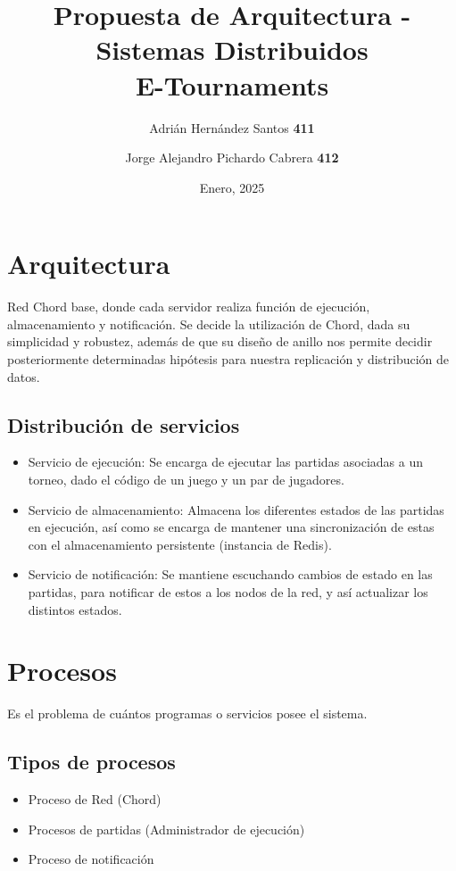 \documentclass{article}
\title{Propuesta de Arquitectura - Sistemas Distribuidos \\ \textbf{E-Tournaments}}
\author{Adrián Hernández Santos \textbf{411} \and Jorge Alejandro Pichardo Cabrera \textbf{412}}
\date{Enero, 2025}
\begin{document}
\maketitle

\section{Arquitectura}
Red Chord base, donde cada servidor realiza función de ejecución, almacenamiento y notificación.
Se decide la utilización de Chord, dada su simplicidad y robustez, además de que su diseño de anillo nos permite decidir posteriormente determinadas hipótesis para nuestra replicación y distribución de datos.

\subsection{Distribución de servicios}
\begin{itemize}
\item{Servicio de ejecución:} Se encarga de ejecutar las partidas asociadas a un torneo, dado el código de un juego y un par de jugadores.
\item{Servicio de almacenamiento:} Almacena los diferentes estados de las partidas en ejecución, así como se encarga de mantener una sincronización de estas con el almacenamiento persistente (instancia de Redis).
\item{Servicio de notificación:} Se mantiene escuchando cambios de estado en las partidas, para notificar de estos a los nodos de la red, y así actualizar los distintos estados.
\end{itemize}

\section{Procesos}
Es el problema de cuántos programas o servicios posee el sistema.

\subsection{Tipos de procesos}
\begin{itemize}
\item{Proceso de Red (Chord)}
\item{Procesos de partidas (Administrador de ejecución)}
\item{Proceso de notificación}
\end{itemize}
\end{document}
